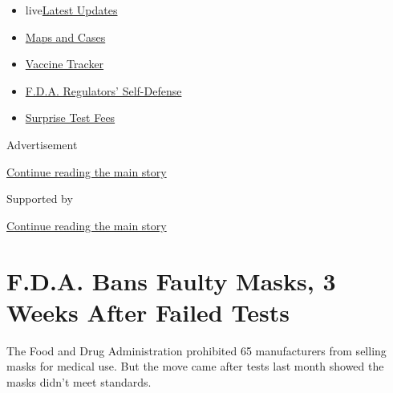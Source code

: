 \begin{itemize}
\tightlist
\item
  live\href{https://www.nytimes3xbfgragh.onion/2020/09/11/world/covid-19-coronavirus.html?name=styln-coronavirus-national\&region=TOP_BANNER\&block=storyline_menu_recirc\&action=click\&pgtype=Article\&impression_id=45784e51-f4bd-11ea-9a28-53af4ab06a19\&variant=undefined}{Latest
  Updates}
\item
  \href{https://www.nytimes3xbfgragh.onion/interactive/2020/us/coronavirus-us-cases.html?name=styln-coronavirus-national\&region=TOP_BANNER\&block=storyline_menu_recirc\&action=click\&pgtype=Article\&impression_id=45784e52-f4bd-11ea-9a28-53af4ab06a19\&variant=undefined}{Maps
  and Cases}
\item
  \href{https://www.nytimes3xbfgragh.onion/interactive/2020/science/coronavirus-vaccine-tracker.html?name=styln-coronavirus-national\&region=TOP_BANNER\&block=storyline_menu_recirc\&action=click\&pgtype=Article\&impression_id=45784e53-f4bd-11ea-9a28-53af4ab06a19\&variant=undefined}{Vaccine
  Tracker}
\item
  \href{https://www.nytimes3xbfgragh.onion/2020/09/10/us/politics/fda-coronavirus-vaccine.html?name=styln-coronavirus-national\&region=TOP_BANNER\&block=storyline_menu_recirc\&action=click\&pgtype=Article\&impression_id=45787560-f4bd-11ea-9a28-53af4ab06a19\&variant=undefined}{F.D.A.
  Regulators' Self-Defense}
\item
  \href{https://www.nytimes3xbfgragh.onion/2020/09/09/upshot/coronavirus-surprise-test-fees.html?name=styln-coronavirus-national\&region=TOP_BANNER\&block=storyline_menu_recirc\&action=click\&pgtype=Article\&impression_id=45787561-f4bd-11ea-9a28-53af4ab06a19\&variant=undefined}{Surprise
  Test Fees}
\end{itemize}

Advertisement

\protect\hyperlink{after-top}{Continue reading the main story}

Supported by

\protect\hyperlink{after-sponsor}{Continue reading the main story}

\hypertarget{fda-bans-faulty-masks-3-weeks-after-failed-tests}{%
\section{F.D.A. Bans Faulty Masks, 3 Weeks After Failed
Tests}\label{fda-bans-faulty-masks-3-weeks-after-failed-tests}}

The Food and Drug Administration prohibited 65 manufacturers from
selling masks for medical use. But the move came after tests last month
showed the masks didn't meet standards.

